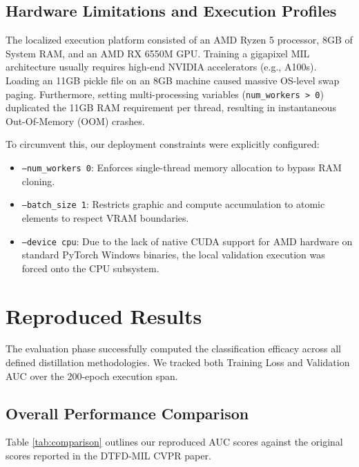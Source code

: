 \documentclass[11pt,a4paper]{article}
\begin{document}
\subsection{Hardware Limitations and Execution Profiles}
The localized execution platform consisted of an AMD Ryzen 5 processor, 8GB of System RAM, and an AMD RX 6550M GPU. Training a gigapixel MIL architecture usually requires high-end NVIDIA accelerators (e.g., A100s). Loading an 11GB pickle file on an 8GB machine caused massive OS-level swap paging. Furthermore, setting multi-processing variables (\texttt{num\_workers > 0}) duplicated the 11GB RAM requirement per thread, resulting in instantaneous Out-Of-Memory (OOM) crashes.

To circumvent this, our deployment constraints were explicitly configured:
\begin{itemize}
    \item \texttt{--num\_workers 0}: Enforces single-thread memory allocation to bypass RAM cloning.
    \item \texttt{--batch\_size 1}: Restricts graphic and compute accumulation to atomic elements to respect VRAM boundaries.
    \item \texttt{--device cpu}: Due to the lack of native CUDA support for AMD hardware on standard PyTorch Windows binaries, the local validation execution was forced onto the CPU subsystem.
\end{itemize}

\section{Reproduced Results}
The evaluation phase successfully computed the classification efficacy across all defined distillation methodologies. We tracked both Training Loss and Validation AUC over the 200-epoch execution span.

\subsection{Overall Performance Comparison}
Table \ref{tab:comparison} outlines our reproduced AUC scores against the original scores reported in the DTFD-MIL CVPR paper.
\end{document}
